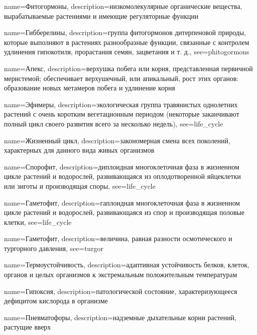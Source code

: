 {
name={Фитогормоны},
description={низкомолекулярные органические вещества, вырабатываемые растениями и имеющие регуляторные функции}
}

{
name={Гибберелины},
description={группа фитогормонов дитерпеновой природы, которые выполняют в растениях разнообразные функции, связанные с контролем удлинения гипокотиля, прорастания семян, зацветания и т. д.},
see={phitogormons}
}

{
name={Апекс},
description={верхушка побега или корня, представленная первичной меристемой; обеспечивает верхушечный, или апикальный, рост этих органов: образование новых метамеров побега и удлинение корня}
}

{
name={Эфимеры},
description={экологическая группа травянистых однолетних растений с очень коротким вегетационным периодом (некоторые заканчивают полный цикл своего развития всего за несколько недель)},
see={life_cycle}
}

{
name={Жизненный цикл},
description={закономерная смена всех поколений, характерных для данного вида живых организмов}
}

{
name={Спорофит},
description={диплоидная многоклеточная фаза в жизненном цикле растений и водорослей, развивающаяся из оплодотворенной яйцеклетки или зиготы и производящая споры},
see={life_cycle}
}

{
name={Гаметофит},
description={гаплоидная многоклеточная фаза в жизненном цикле растений и водорослей, развивающаяся из спор и производящая половые клетки},
see={life_cycle}
}

{
name={Гаметофит},
description={величина, равная разности осмотического и тургорного давления},
see={turgor}
}

{
name={Термоустойчивость},
description={адаптивная устойчивость белков, клеток, органов и целых организмов к экстремальным положительным температурам}
}

{
name={Гипоксия},
description={патологической состояние, характеризующееся дефицитом кислорода в организме}
}

{
name={Пневматофоры},
description={надземные дыхательные корни растений, растущие вверх}
}

